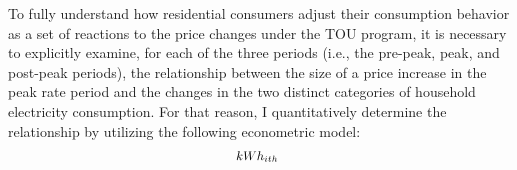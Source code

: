 To fully understand how residential consumers adjust their consumption behavior as a set of reactions to the price changes under the TOU program, it is necessary to explicitly examine, for each of the three periods (i.e., the pre-peak, peak, and post-peak periods), the relationship between the size of a price increase in the peak rate period and the changes in the two distinct categories of household electricity consumption. For that reason, I quantitatively determine the relationship by utilizing the following econometric model:
\begin{equation}
\small
\begin{split}
    kWh_{ith} \ 

\end{split}
\end{equation}
